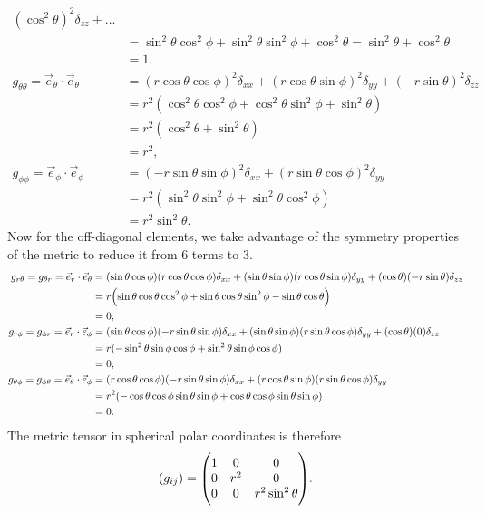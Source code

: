 \documentclass[gr-notes.tex]{subfiles}
\begin{document}
\begin{enumerate}[(a)]
\begin{align*}
  (\cos^2\theta)^2 \delta_{zz} +
  \ldots
  \\ &=
  \sin^2\theta \cos^2\phi +
  \sin^2\theta \sin^2\phi +
  \cos^2\theta =
  \sin^2\theta + \cos^2\theta
  \\ &=
  1,
  \\
  g_{\theta\theta} =
  \vec{e}_\theta \cdot \vec{e}_\theta &=
  (r \cos\theta \cos\phi)^2 \delta_{xx} +
  (r \cos\theta \sin\phi)^2 \delta_{yy} +
  (-r \sin\theta)^2 \delta_{zz}
  \\ &=
  r^2 (\cos^2\theta \cos^2\phi + \cos^2\theta \sin^2\phi + \sin^2\theta)
  \\ &=
  r^2 (\cos^2\theta + \sin^2\theta)
  \\ &=
  r^2,
  \\
  g_{\phi\phi} =
  \vec{e}_\phi \cdot \vec{e}_\phi &=
  (-r \sin\theta \sin\phi)^2 \delta_{xx} +
  ( r \sin\theta \cos\phi)^2 \delta_{yy}
  \\ &=
  r^2 (\sin^2\theta \sin^2\phi + \sin^2\theta \cos^2 \phi)
  \\ &=
  r^2 \sin^2\theta.
\end{align*}
%
Now for the off-diagonal elements, we take advantage of the symmetry properties of the metric to reduce it from 6 terms to 3.
%
\begin{align*}
  g_{r \theta} = g_{\theta r} =
  \vec{e}_r \cdot \vec{e}_\theta &=
  (\sin\theta \cos\phi) ( r \cos\theta \cos\phi) \delta_{xx} +
  (\sin\theta \sin\phi) ( r \cos\theta \sin\phi) \delta_{yy} +
  (\cos\theta)          (-r \sin\theta)          \delta_{zz}
  \\ &=
  r \qty(
    \sin\theta \cos\theta \cos^2\phi +
    \sin\theta \cos\theta \sin^2\phi -
    \sin\theta \cos\theta
  )
  \\ &=
  0,
  \\
  g_{r \phi} = g_{\phi r} =
  \vec{e}_r \cdot \vec{e}_\phi &=
  (\sin\theta \cos\phi) (-r \sin\theta \sin\phi) \delta_{xx} +
  (\sin\theta \sin\phi) ( r \sin\theta \cos\phi) \delta_{yy} +
  (\cos\theta) (0) \delta_{zz}
  \\ &=
  r (-\sin^2\theta \sin\phi \cos\phi + \sin^2\theta \sin\phi \cos\phi)
  \\ &=
  0,
  \\
  g_{\theta \phi} = g_{\phi \theta} =
  \vec{e}_\theta \cdot \vec{e}_\phi &=
  (r \cos\theta \cos\phi) (-r \sin\theta \sin\phi) \delta_{xx} +
  (r \cos\theta \sin\phi) ( r \sin\theta \cos\phi) \delta_{yy}
  \\ &=
  r^2 (
   -\cos\theta \cos\phi \sin\theta \sin\phi +
    \cos\theta \cos\phi \sin\theta \sin\phi
  )
  \\ &=
  0.
\end{align*}
%
The metric tensor in spherical polar coordinates is therefore
%
\begin{displaymath}
  (g_{ij}) = \mqty(\dmat[0]{1,r^2,r^2\sin^2\theta}).
\end{displaymath}


\end{enumerate}
\end{document}
